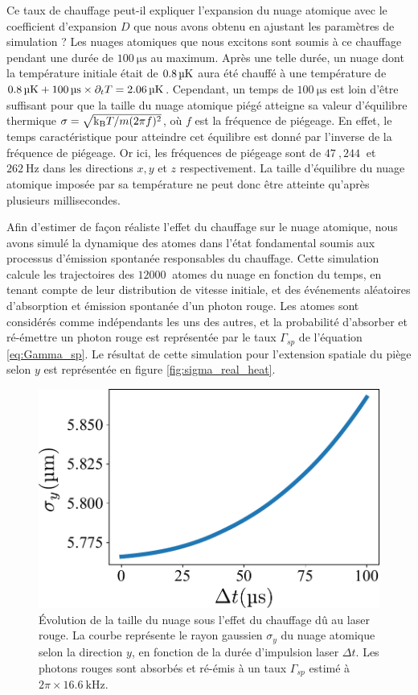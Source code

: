 Ce taux de chauffage peut-il expliquer l'expansion du nuage atomique avec le coefficient d'expansion $D$ que nous avons obtenu en ajustant les paramètres de simulation ?
Les nuages atomiques que nous excitons sont soumis à ce chauffage pendant une durée de $\SI{100}{\us}$ au maximum.
Après une telle durée, un nuage dont la température initiale était de $\SI{0.8}{\si{\micro\kelvin}}$ aura été chauffé à une température de $\SI{0.8}{\uK}+\SI{100}{\us}\times\partial_t T = \SI{2.06}{\uK}$.
Cependant, un temps de $\SI{100}{\us}$ est loin d'être suffisant pour que la taille du nuage atomique piégé atteigne sa valeur d'équilibre thermique $\sigma=\sqrt{\mathrm{k_B} T /m(2\pi f)^2}$, où $f$ est la fréquence de piégeage.
En effet, le temps caractéristique pour atteindre cet équilibre est donné par l'inverse de la fréquence de piégeage.
Or ici, les fréquences de piégeage sont de $\SI{47}{},\SI{244}{}$ et $\SI{262}{\Hz}$ dans les directions $x,y$ et $z$ respectivement.
La taille d'équilibre du nuage atomique imposée par sa température ne peut donc être atteinte qu'après plusieurs millisecondes.

Afin d'estimer de façon réaliste l'effet du chauffage sur le nuage atomique, nous avons simulé la dynamique des atomes dans l'état fondamental soumis aux processus d'émission spontanée responsables du chauffage.
Cette simulation calcule les trajectoires des $\SI{12000}{}$ atomes du nuage en fonction du temps, en tenant compte de leur distribution de vitesse initiale, et des événements aléatoires d'absorption et émission spontanée d'un photon rouge.
Les atomes sont considérés comme indépendants les uns des autres, et la probabilité d'absorber et ré-émettre un photon rouge est représentée par le taux $\Gamma_{sp}$ de l'équation \eqref{eq:Gamma_sp}.
Le résultat de cette simulation pour l'extension spatiale du piège selon $y$ est représentée en figure \eqref{fig:sigma_real_heat}.

\begin{figure}[h]
\centering
\includegraphics[width=0.6\linewidth]{figures/low_l/sigmaytime}
\caption[Évolution de la taille du nuage sous l'effet du chauffage dû au laser rouge]{
Évolution de la taille du nuage sous l'effet du chauffage dû au laser rouge.
La courbe représente le rayon gaussien $\sigma_y$ du nuage atomique selon la direction $y$, en fonction de la durée d'impulsion laser $\Delta t$.
Les photons rouges sont absorbés et ré-émis à un taux $\Gamma_{sp}$ estimé à $2\pi\times\SI{16.6}{\kHz}$.
}
\label{fig:sigma_real_heat}
\end{figure}

